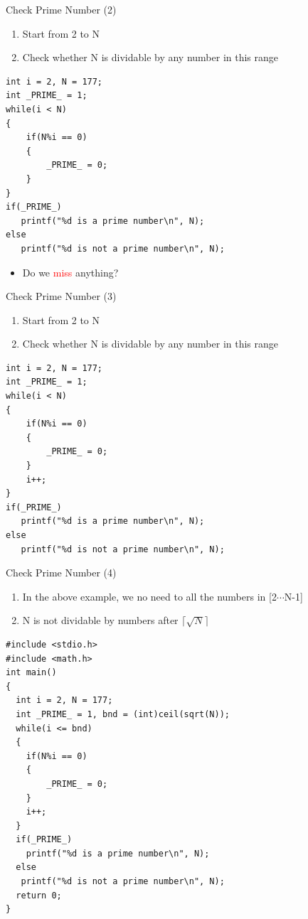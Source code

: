 \begin{frame}[fragile]{Check Prime Number (2)}
\vspace{-0.2in}
\begin{enumerate}
	\item {Start from 2 to N}
	\item {Check whether N is dividable by any number in this range}
\end{enumerate}
	\begin{lstlisting}[linewidth=0.7\linewidth]
int i = 2, N = 177;
int _PRIME_ = 1;
while(i < N)
{
    if(N%i == 0)
    {
        _PRIME_ = 0;
    }
}
if(_PRIME_)
   printf("%d is a prime number\n", N);
else
   printf("%d is not a prime number\n", N);
\end{lstlisting}
\vspace{-0.1in}
\begin{itemize}
	\item {Do we \textcolor{red}{miss} anything?}
\end{itemize}
\end{frame}

\begin{frame}[fragile]{Check Prime Number (3)}
\begin{enumerate}
	\item {Start from 2 to N}
	\item {Check whether N is dividable by any number in this range}
\end{enumerate}
\begin{center}

	\begin{lstlisting}[linewidth=0.7\linewidth]
int i = 2, N = 177;
int _PRIME_ = 1;
while(i < N)
{
    if(N%i == 0)
    {
        _PRIME_ = 0;
    }
    i++;
}
if(_PRIME_)
   printf("%d is a prime number\n", N);
else
   printf("%d is not a prime number\n", N);
\end{lstlisting}

\end{center}
\end{frame}

\begin{frame}[fragile]{Check Prime Number (4)}
\vspace{-0.1in}
\begin{enumerate}
	\item {In the above example, we no need to all the numbers in [2$\cdots$N-1]}
	\item {N is not dividable by numbers after $\lceil\sqrt{N}\rceil$}
\end{enumerate}
	\begin{lstlisting}[basicstyle=\scriptsize,linewidth=0.7\linewidth]
#include <stdio.h>
#include <math.h>
int main()
{
  int i = 2, N = 177;
  int _PRIME_ = 1, bnd = (int)ceil(sqrt(N));
  while(i <= bnd)
  {
    if(N%i == 0)
    {
        _PRIME_ = 0;
    }
    i++;
  }
  if(_PRIME_)
    printf("%d is a prime number\n", N);
  else
   printf("%d is not a prime number\n", N);
  return 0;
}
\end{lstlisting}
\end{frame}

